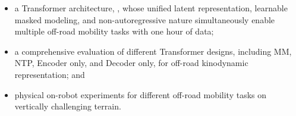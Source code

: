 \begin{itemize}
    \item a Transformer architecture, \former, whose unified latent representation, learnable masked modeling, and  non-autoregressive nature simultaneously enable multiple off-road mobility tasks with one hour of data;
    \item a comprehensive evaluation of different Transformer designs, including MM, NTP, Encoder only, and Decoder only, for off-road kinodynamic representation; and
    \item physical on-robot experiments for different off-road mobility tasks on vertically challenging terrain.
\end{itemize}












